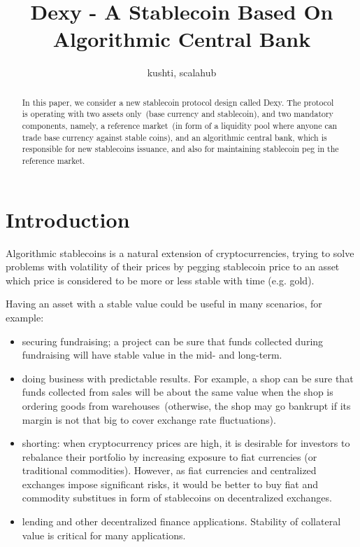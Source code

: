 \documentclass{article}   %
\newcommand{\dx}{Dexy}
\begin{document}
\title{Dexy - A Stablecoin Based On Algorithmic Central Bank}
\author{kushti, scalahub}


\maketitle

\begin{abstract}
In this paper, we consider a new stablecoin protocol design called \dx. The protocol is operating with two assets only~(base currency and stablecoin), and two mandatory components, namely, a reference market~(in form of a liquidity pool where anyone can 
trade base currency against stable coins), and an algorithmic central bank, which is responsible for new stablecoins issuance, and also for maintaining stablecoin peg in the reference market.
\end{abstract}


\section{Introduction}

Algorithmic stablecoins is a natural extension of cryptocurrencies, trying to 
solve problems with volatility of their prices by pegging stablecoin price to an
asset which price is considered to be more or less stable with time (e.g. gold).  

Having an asset with a stable value could be useful in many scenarios, for example:
\begin{itemize}
\item securing fundraising; a project can be sure that funds collected during fundraising will have stable value in the mid- and long-term.
\item doing business with predictable results. For example, a shop can be sure that funds collected from sales will be about the same value when the shop is ordering goods from warehouses~(otherwise, the shop may go bankrupt if its margin is not that big to cover exchange rate fluctuations). 
\item shorting: when cryptocurrency prices are high, it is desirable for investors to rebalance their portfolio by increasing exposure to fiat currencies (or traditional
 commodities). However, as fiat currencies and centralized exchanges impose significant risks, it would be better to buy fiat and commodity substitues in form of stablecoins on decentralized exchanges.
\item lending and other decentralized finance applications. Stability of collateral value is critical for many applications.
\end{itemize}
\end{document}
